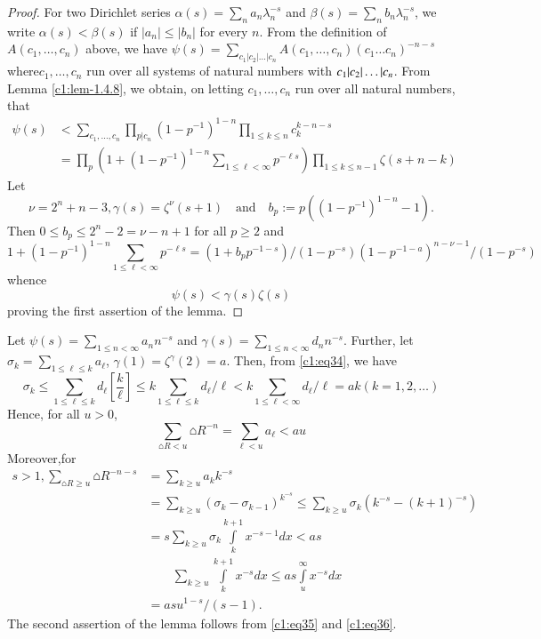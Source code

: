 \begin{proof}
For two Dirichlet series
$\alpha(s)=\sum\limits_{n}a_{n}\lambda^{-s}_{n}$ and
$\beta(s)=\sum\limits_{n}b_{n}\lambda^{-s}_{n}$, we write
$\alpha(s)< \beta(s)$ if $|a_{n}|\leq |b_{n}|$ for every $n$. From
the definition of $A(c_{1},\ldots,c_{n})$ above, we have
$\psi(s)=\sum\limits_{c_{1}|c_{2}|\ldots|c_{n}}A(c_{1},\ldots,c_{n})(c_{1}\ldots
c_{n})^{-n-s}$ where\pageoriginale $c_{1},\ldots,c_{n}$ run over all
systems of natural numbers with $c_{1}|c_{2}|\ldots\break |c_{n}$. From
Lemma \ref{c1:lem-1.4.8}, we obtain, on letting $c_{1},\ldots,c_{n}$ run
over all natural numbers, that
\begin{align*}
\psi(s)&<
\sum_{c_{1},\ldots,c_{n}}\prod_{p|c_{n}}(1-p^{-1})^{1-n}\prod_{1\leq
  k\leq n}c^{k-n-s}_{k}\\
&=\prod_{p}\left(1+(1-p^{-1})^{1-n}\sum_{1\leq
  \ell <\infty}p^{-\ell s}\right)\prod_{1\leq k\leq n-1}\zeta(s+n-k) 
\end{align*}
Let 
$$
\nu=2^{n}+n-3, \gamma(s)=\zeta^{\nu}(s+1)\quad\text{and}\quad
b_{p}:=p((1-p^{-1})^{1-n}-1).
$$
Then $0\leq b_{p}\leq 2^{n}-2=\nu -n+1$ for all $p\geq 2$ and
{\fontsize{10}{12}\selectfont
$$
1+(1-p^{-1})^{1-n}\sum_{1\leq \ell <\infty} p^{-\ell
  s}=(1+b_{p}p^{-1-s})/(1-p^{-s})(1-p^{-1-a})^{n-\nu-1}/(1-p^{-s}) 
$$}\relax
whence
\begin{equation*}
\psi(s)<\gamma(s)\zeta(s)\tag{34}\label{c1:eq34}
\end{equation*}
proving the first assertion of the lemma.
\end{proof}

Let $\psi(s)=\sum_{1\leq n<\infty}a_{n}n^{-s}$ and
$\gamma(s)=\sum\limits_{1\leq n<\infty}d_{n}n^{-s}$. Further, let
$\sigma_{k}=\sum\limits_{1\leq \ell\leq k}a_{\ell}$,
$\gamma(1)=\zeta^{\gamma}(2)=a$. Then, from \eqref{c1:eq34}, we have
$$
\sigma_{k}\leq \sum_{1\leq \ell\leq k}d_{\ell}[\frac{k}{\ell}]\leq
k\sum_{1\leq \ell \leq k}d_{\ell}/\ell <k\sum_{1\leq \ell
  <\infty}d_{\ell}/\ell=ak(k=1,2,\ldots) 
$$
Hence, for all $u>0$,
\begin{equation*}
\sum_{\house{R}<u}{\house{R}}^{-n}=\sum_{\ell<u}a_{\ell}<au\tag{35}\label{c1:eq35} 
\end{equation*}
Moreover,\pageoriginale for
\begin{align*}
 s>1, \sum_{\house{R}\geq
    u}{\house{R}}^{-n-s}&=\sum_{k\geq u}a_{k}k^{-s}\\
&=\sum_{k\geq
    u}(\sigma_{k}-\sigma_{k-1})^{k^{-s}}\leq \sum_{k\geq
    u}\sigma_{k}(k^{-s}-(k+1)^{-s})\\
& =s\sum_{k\geq
    u}\sigma_{k}\int\limits^{k+1}_{k}x^{-s-1}dx<as\\
&\qquad\sum\limits_{k\geq
    u}\int\limits^{k+1}_{k}x^{-s}dx\leq as  \int\limits^{\infty}_{u}x^{-s}dx\\
&=as u^{1-s}/(s-1).\tag{36}\label{c1:eq36}
\end{align*}
The second assertion of the lemma follows from \eqref{c1:eq35} and
\eqref{c1:eq36}.


